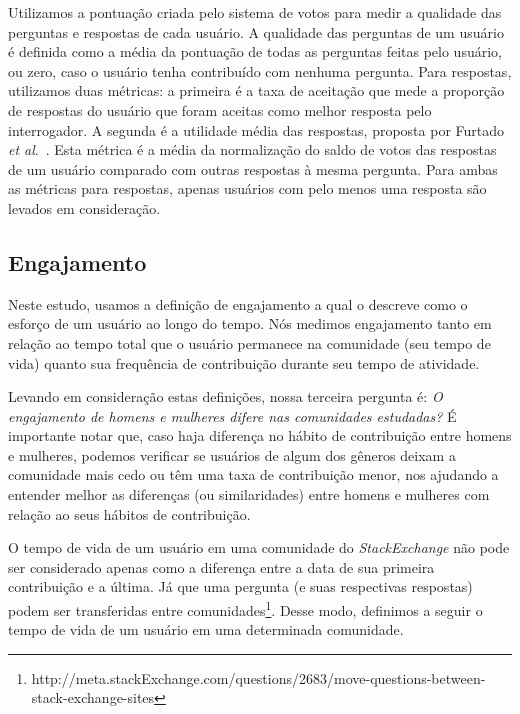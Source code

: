 Utilizamos a pontuação criada pelo sistema de votos para medir a qualidade das perguntas e respostas de cada usuário. A qualidade das perguntas de um usuário é definida como a média da pontuação de todas as perguntas feitas pelo usuário, ou zero, caso o usuário tenha contribuído com nenhuma pergunta. Para respostas, utilizamos duas métricas: a primeira é a taxa de aceitação que mede a proporção de respostas do usuário que foram aceitas como melhor resposta pelo interrogador. A segunda é a utilidade média das respostas, proposta por Furtado \textit{et al}.~\cite{furtado2013contributor}. Esta métrica é a média da normalização do saldo de votos das respostas de um usuário comparado com outras respostas à mesma pergunta. Para ambas as métricas para respostas, apenas usuários com pelo menos uma resposta são levados em consideração.

\subsection{Engajamento}

Neste estudo, usamos a definição de engajamento a qual o descreve como o esforço de um usuário ao longo do tempo. Nós medimos engajamento tanto em relação ao tempo total que o usuário permanece na comunidade (seu tempo de vida) quanto sua frequência de contribuição durante seu tempo de atividade.

Levando em consideração estas definições, nossa terceira pergunta é: \textit{O engajamento de homens e mulheres difere nas comunidades estudadas?} É importante notar que, caso haja diferença no hábito de contribuição entre homens e mulheres, podemos verificar se usuários de algum dos gêneros deixam a comunidade mais cedo ou têm uma taxa de contribuição menor, nos ajudando a entender melhor as diferenças (ou similaridades) entre homens e mulheres com relação ao seus hábitos de contribuição.

O tempo de vida de um usuário em uma comunidade do \emph{StackExchange} não pode ser considerado apenas como a diferença entre a data de sua primeira contribuição e a última. Já que uma pergunta (e suas respectivas respostas) podem ser transferidas entre comunidades\footnote{http://meta.stackExchange.com/questions/2683/move-questions-between-stack-exchange-sites}. Desse modo, definimos a seguir o tempo de vida de um usuário em uma determinada comunidade. 

